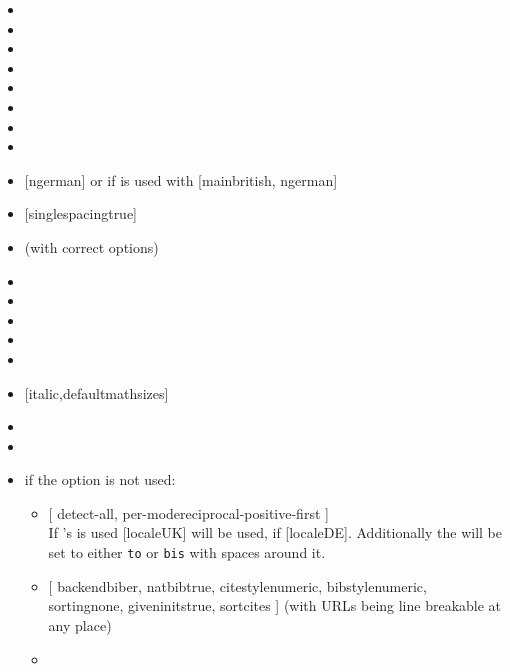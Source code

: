 \begin{multicols}{2}%
  \begin{itemize}[leftmargin=10pt]
    \item {}
    \item {}
    \item {}
    \item {}
    \item {}
    \item {}
    \item {}
    \item {}
    \item {} [ngerman] or if  is used with
      [main\Seq british, ngerman]
    \item {} [singlespacing\Seq true]
    \item {} (with correct options)
    \item {}
    \item {}
    \item {}
    \item {}
    \item {}
    \item {} [italic,defaultmathsizes]
    \item {}
    \item {}
    \item if the  option is not used:
      \begin{itemize}
        \item {}
          [%
            detect-all,
            per-mode\Seq reciprocal-positive-first%
          ]\\
          If 's  is used [locale\Seq UK] will be used,
          if  [locale\Seq DE]. Additionally the 
          will be set to either \texttt{to} or \texttt{bis} with spaces around
          it.
        \item {}
          [%
            backend\Seq biber, natbib\Seq true, citestyle\Seq numeric,
            bibstyle\Seq numeric, sorting\Seq none, giveninits\Seq true,
            sortcites%
          ] (with URLs being line breakable at any place)
        \item {}
      \end{itemize}
  \end{itemize}
\end{multicols}%

